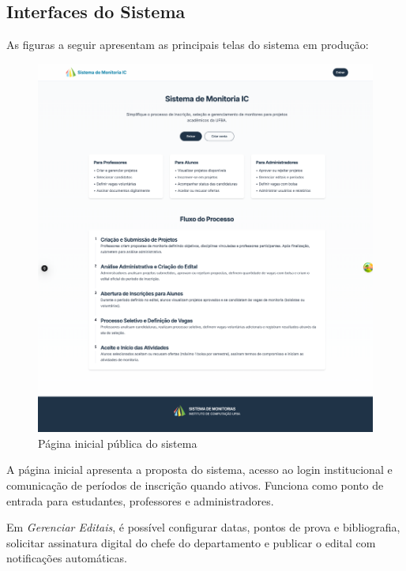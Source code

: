 \documentclass[portuguese]{sbc2025}%
\begin{document}
\subsection{Interfaces do Sistema}

As figuras a seguir apresentam as principais telas do sistema em produção:

\begin{figure}[h!]
  \centering
  \includegraphics[width=\linewidth]{images/monitoria/landing.png}
  \caption{Página inicial pública do sistema}
  \label{fig:landing}
\end{figure}

A página inicial apresenta a proposta do sistema, acesso ao login institucional e comunicação de períodos de inscrição quando ativos. Funciona como ponto de entrada para estudantes, professores e administradores.

Em \textit{Gerenciar Editais}, é possível configurar datas, pontos de prova e bibliografia, solicitar assinatura digital do chefe do departamento e publicar o edital com notificações automáticas.
\end{document}
